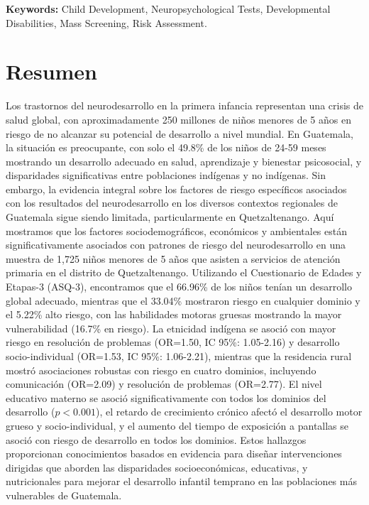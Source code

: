 \documentclass[11pt,letterpaper]{report}
\begin{document}
\textbf{Keywords:} Child Development, Neuropsychological Tests, Developmental
Disabilities, Mass Screening, Risk Assessment.

\chapter*{Resumen}

Los trastornos del neurodesarrollo en la primera infancia representan una 
crisis de salud global, con aproximadamente 250 millones de niños menores de 5 
años en riesgo de no alcanzar su potencial de desarrollo a nivel mundial. En 
Guatemala, la situación es preocupante, con solo el 49.8\% de los 
niños de 24-59 meses mostrando un desarrollo adecuado en salud, aprendizaje y 
bienestar psicosocial, y disparidades significativas entre poblaciones 
indígenas y no indígenas. Sin embargo, la evidencia integral sobre los factores 
de riesgo específicos asociados con los resultados del neurodesarrollo en los 
diversos contextos regionales de Guatemala sigue siendo limitada, 
particularmente en Quetzaltenango. Aquí mostramos que los 
factores sociodemográficos, económicos y ambientales están significativamente 
asociados con patrones de riesgo del neurodesarrollo en una muestra de 1,725 
niños menores de 5 años que asisten a servicios de atención primaria en el 
distrito de Quetzaltenango. Utilizando el Cuestionario de Edades y Etapas-3 
(ASQ-3), encontramos que el 66.96\% de los niños tenían un desarrollo global 
adecuado, mientras que el 33.04\% mostraron riesgo en cualquier dominio y el 
5.22\% alto riesgo, con las habilidades motoras gruesas mostrando la mayor 
vulnerabilidad (16.7\% en riesgo). La etnicidad indígena se asoció con mayor 
riesgo en resolución de problemas (OR=1.50, IC 95\%: 1.05-2.16) y desarrollo 
socio-individual (OR=1.53, IC 95\%: 1.06-2.21), mientras que la residencia 
rural mostró asociaciones robustas con riesgo en cuatro dominios, incluyendo 
comunicación (OR=2.09) y resolución de problemas (OR=2.77). El nivel educativo 
materno se asoció significativamente con todos los dominios del desarrollo 
($p<0.001$), el retardo de crecimiento crónico afectó el desarrollo motor 
grueso y socio-individual, y el aumento del tiempo de exposición a pantallas 
se asoció con riesgo de desarrollo en todos los dominios. Estos hallazgos 
proporcionan conocimientos basados en evidencia para diseñar intervenciones 
dirigidas que aborden las disparidades socioeconómicas, educativas, y
nutricionales  para mejorar el desarrollo infantil temprano en las poblaciones
más  vulnerables de Guatemala.
\end{document}
